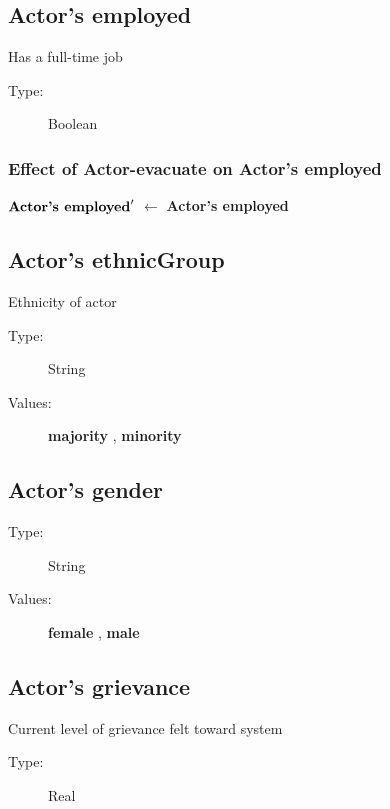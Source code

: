\documentclass{article}%
\begin{document}
%
\subsection{Actor's employed}%
\label{subsec:Actor's employed}%
Has a full{-}time job%
\begin{description}%
\item[Type:]%
Boolean%
\end{description}%
\subsubsection{Effect of Actor{-}evacuate on Actor's employed}%
\label{ssubsec:Effect of Actor{-}evacuate on Actor's employed}%
\begin{flushleft}%
$\mbox{\textbf{Actor's employed}} '$%
$\leftarrow$%
\textbf{Actor's employed}%
\end{flushleft}

%
\subsection{Actor's ethnicGroup}%
\label{subsec:Actor's ethnicGroup}%
Ethnicity of actor%
\begin{description}%
\item[Type:]%
String%
\item[Values:]%
\textbf{majority}%
, %
\textbf{minority}%
\end{description}

%
\subsection{Actor's gender}%
\label{subsec:Actor's gender}%
\begin{description}%
\item[Type:]%
String%
\item[Values:]%
\textbf{female}%
, %
\textbf{male}%
\end{description}

%
\subsection{Actor's grievance}%
\label{subsec:Actor's grievance}%
Current level of grievance felt toward system%
\begin{description}%
\item[Type:]%
Real%
\end{description}%
\end{document}
